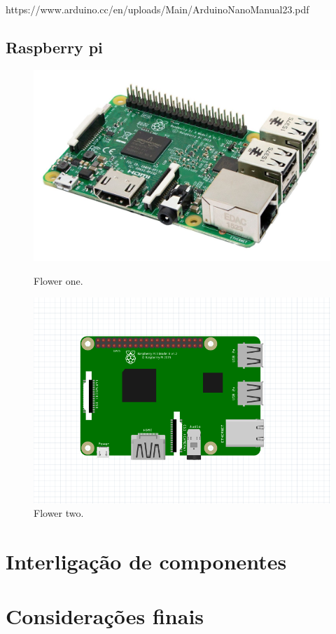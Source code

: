 https://www.arduino.cc/en/uploads/Main/ArduinoNanoManual23.pdf


\newpage

\subsection{Raspberry pi }


\begin{figure}[h]
	\centering
	\begin{minipage}[b]{0.4\textwidth}
		\includegraphics[width=\textwidth]{img/hardware/rasp3-img.jpg}
		\caption{Flower one.}
	\end{minipage}
	\hfill
	\begin{minipage}[b]{0.4\textwidth}
		\includegraphics[width=\textwidth]{img/hardware/rasp-esquema.PNG}
		\caption{Flower two.}
	\end{minipage}
\end{figure}


\newpage
\section{Interligação de componentes}




\section{Considerações finais}
